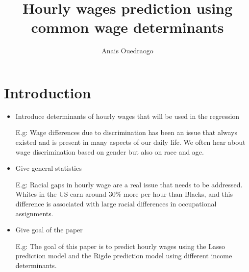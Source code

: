 \documentclass{article}
\title{Hourly wages prediction using common wage determinants}
\author{Anais Ouedraogo}
\begin{document}
\maketitle

\section{Introduction}

\begin{itemize}
\item Introduce determinants of hourly wages that will be used in the regression

E.g: Wage differences due to discrimination has been an issue that always existed and is present in many aspects of our daily life. We often hear about wage discrimination based on gender but also on race and age.
\item Give  general statistics

E.g: Racial gaps in hourly wage are a real issue that needs to be addressed. Whites in the US earn around 30\%  more per hour than Blacks, and this difference is associated with large racial differences in occupational assignments.\cite{golan2019} 
\item Give goal of the paper

E.g: The goal of this paper is to predict hourly wages using the Lasso prediction model and the Rigde prediction model using different income determinants.
\end{itemize}
\end{document}

